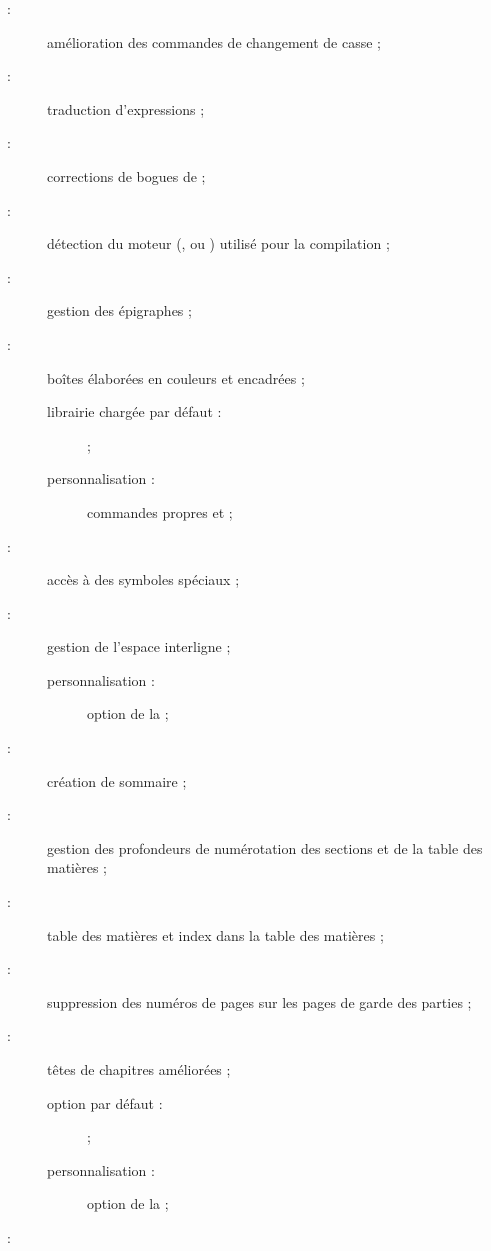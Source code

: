 \begin{description}
\item[ :] amélioration des commandes de changement de
  casse ;
\item[ :] traduction d'expressions ;
\item[ :] corrections de bogues de  ;
\item[ :] détection du moteur (, 
  ou ) utilisé pour la compilation ;
\item[ :] gestion des épigraphes ;
\item[ :] boîtes élaborées en couleurs et encadrées ;
  \begin{description}
  \item[librairie chargée par défaut :]  ;
  \item[personnalisation :] commandes propres  et
     ;
  \end{description}
\item[ :] accès à des symboles spéciaux ;
\item[ :] gestion de l'espace interligne ;
  \begin{description}
  \item[personnalisation :] option  de la \yatcl ;
  \end{description}
\item[ :] création de sommaire ;
\item[ :] gestion des profondeurs de numérotation des
  sections et de la table des matières ;
\item[ :] table des matières et index dans la table des
  matières ;
\item[ :] suppression des numéros de pages sur les pages
  de garde des parties ;
\item[ :] têtes de chapitres améliorées ;
  \begin{description}
  \item[option par défaut :]  ;
  \item[personnalisation :] option  de la \yatcl ;
  \end{description}
\item[ :] %

\end{description}
